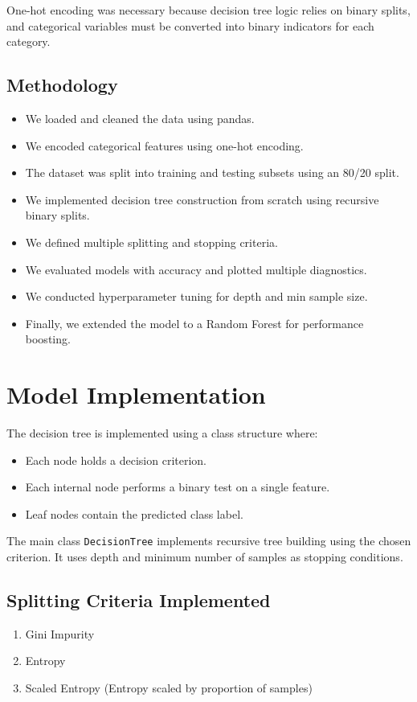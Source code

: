 \documentclass[11pt]{article}
\begin{document}
One-hot encoding was necessary because decision tree logic relies on binary splits, and categorical variables must be converted into binary indicators for each category.

\subsection{Methodology}
\begin{itemize}
    \item We loaded and cleaned the data using pandas.
    \item We encoded categorical features using one-hot encoding.
    \item The dataset was split into training and testing subsets using an 80/20 split.
    \item We implemented decision tree construction from scratch using recursive binary splits.
    \item We defined multiple splitting and stopping criteria.
    \item We evaluated models with accuracy and plotted multiple diagnostics.
    \item We conducted hyperparameter tuning for depth and min sample size.
    \item Finally, we extended the model to a Random Forest for performance boosting.
\end{itemize}

\section{Model Implementation}
The decision tree is implemented using a class structure where:
\begin{itemize}
    \item Each node holds a decision criterion.
    \item Each internal node performs a binary test on a single feature.
    \item Leaf nodes contain the predicted class label.
\end{itemize}

The main class \texttt{DecisionTree} implements recursive tree building using the chosen criterion. It uses depth and minimum number of samples as stopping conditions.

\subsection{Splitting Criteria Implemented}
\begin{enumerate}
    \item Gini Impurity
    \item Entropy
    \item Scaled Entropy (Entropy scaled by proportion of samples)
\end{enumerate}
\end{document}
